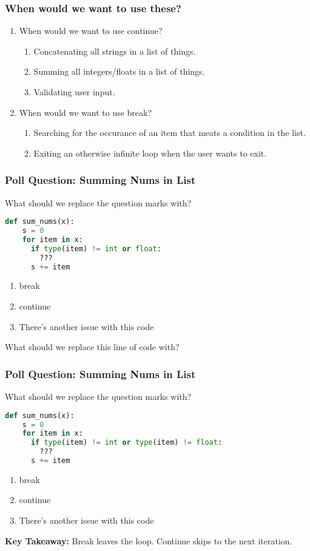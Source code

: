 \documentclass{beamer}
\begin{document}
%
%
\begin{frame}[fragile]
  \frametitle{When would we want to use these?}
  \begin{enumerate}
    \item When would we want to use continue?
      \pause
      \begin{enumerate}
        \item Concatenating all strings in a list of things.
        \item Summing all integers/floats in a list of things.
        \item Validating user input.
      \end{enumerate}
      \pause
    \item When would we want to use break?
      \pause
      \begin{enumerate}
        \item Searching for the occurance of an item that meats a condition in the list.
        \item Exiting an otherwise infinite loop when the user wants to exit.
      \end{enumerate}
  \end{enumerate}
\end{frame}

%
%
\begin{frame}[fragile]
  \frametitle{Poll Question: Summing Nums in List}
  What should we replace the question marks with?
  \begin{lstlisting}[language=Python, autogobble]
  def sum_nums(x):
    s = 0
    for item in x:
      if type(item) != int or float:
        ???
      s += item
  \end{lstlisting}
  \vfill
  \begin{enumerate}[A]
    \item break
    \item continue
    \item There's another issue with this code
  \end{enumerate}
  \pause
  \vfill
  What should we replace this line of code with?
\end{frame}

%
%
\begin{frame}[fragile]
  \frametitle{Poll Question: Summing Nums in List}
  What should we replace the question marks with?
  \begin{lstlisting}[language=Python, autogobble]
  def sum_nums(x):
    s = 0
    for item in x:
      if type(item) != int or type(item) != float:
        ???
      s += item
  \end{lstlisting}
  \vfill
  \begin{enumerate}[A]
    \item break
    \item continue
    \item There's another issue with this code
  \end{enumerate}
  \pause
  \vfill
  \textbf{Key Takeaway:} Break leaves the loop. Continue skips to the next iteration. 
\end{frame}
\end{document}
